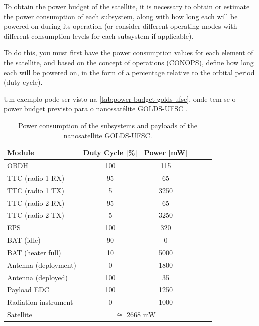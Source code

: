 
To obtain the power budget of the satellite, it is necessary to obtain or estimate the power consumption of each subsystem, along with how long each will be powered on during its operation (or consider different operating modes with different consumption levels for each subsystem if applicable).

To do this, you must first have the power consumption values for each element of the satellite, and based on the concept of operations (CONOPS), define how long each will be powered on, in the form of a percentage relative to the orbital period (duty cycle).

Um exemplo pode ser visto na \autoref{tab:power-budget-golds-ufsc}, onde tem-se o power budget previsto para o nanossatélite GOLDS-UFSC \cite{spacelab2022}.

\begin{table}[!ht]
    \centering
    \begin{tabular}{lccccc}
        \toprule[1.5pt]
        \textbf{Module} & \textbf{Duty Cycle [\%]}    & \textbf{Power [mW]} \\
        \midrule
        OBDH                    & 100   & 115 \\
        TTC (radio 1 RX)        & 95    & 65 \\
        TTC (radio 1 TX)        & 5     & 3250 \\
        TTC (radio 2 RX)        & 95    & 65 \\
        TTC (radio 2 TX)        & 5     & 3250 \\
        EPS                     & 100   & 320 \\
        BAT (idle)              & 90    & 0 \\
        BAT (heater full)       & 10    & 5000 \\
        Antenna (deployment)    & 0     & 1800 \\
        Antenna (deployed)      & 100   & 35 \\
        Payload EDC             & 100   & 1250 \\
        Radiation instrument    & 0     & 1000 \\
        \cmidrule{2-3}
        Satellite               & \multicolumn{2}{c}{$\cong$ 2668 mW} \\
        \bottomrule[1.5pt]
    \end{tabular}
    \caption{Power consumption of the subsystems and payloads of the nanosatellite GOLDS-UFSC.}
    \label{tab:power-budget-golds-ufsc}
\end{table}

